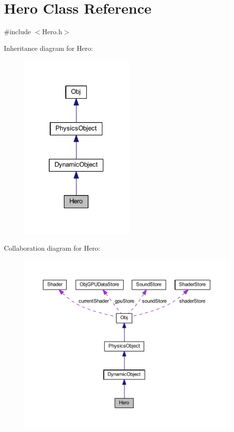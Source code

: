 \hypertarget{class_hero}{}\section{Hero Class Reference}
\label{class_hero}


{\ttfamily \#include $<$Hero.\+h$>$}



Inheritance diagram for Hero\+:
\nopagebreak
\begin{figure}[H]
\begin{center}
\leavevmode
\includegraphics[width=163pt]{class_hero__inherit__graph}
\end{center}
\end{figure}


Collaboration diagram for Hero\+:
\nopagebreak
\begin{figure}[H]
\begin{center}
\leavevmode
\includegraphics[width=350pt]{class_hero__coll__graph}
\end{center}
\end{figure}
